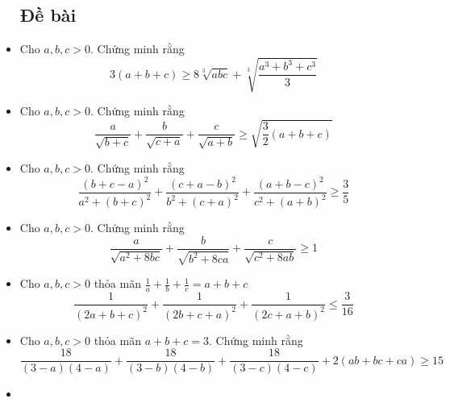 \documentclass[11pt]{scrartcl}
\begin{document}
\begin{itemize}[label=, leftmargin=0em, itemsep=-0em]
    \subsection{\LARGE \textcolor{dk}{Đề bài}}
        \item \begin{btvn}
            Cho $a,b,c >0$. Chứng minh rằng
            \[
                3(a + b + c) \geq 8\sqrt[3]{abc} + \sqrt[3]{\frac{a^3 + b^3 + c^3}{3}}
            \]
        \end{btvn}
        \item \begin{btvn} Cho $a,b,c > 0$. Chứng minh rằng 
        \[
            \frac{a}{\sqrt{b + c}} + \frac{b}{\sqrt{c + a}} + \frac{c}{\sqrt{a + b}} \geq \sqrt{\frac{3}{2}(a + b + c)}
        \]
    \end{btvn}
        \item \begin{btvn}
            Cho $a,b,c >0$. Chứng minh rằng
            \[
                \frac{(b + c - a)^2}{a^2 + (b + c)^2} + \frac{(c + a - b)^2}{b^2 + (c + a)^2} + \frac{(a + b - c)^2}{c^2 + (a + b)^2} \geq \frac{3}{5}
            \]
        \end{btvn}
        \item \begin{btvn}
            Cho $a,b,c >0$. Chứng minh rằng
            \[
                \frac{a}{\sqrt{a^2 + 8bc}} + \frac{b}{\sqrt{b^2 + 8ca}} + \frac{c}{\sqrt{c^2 + 8ab}} \geq 1
            \]
        \end{btvn}
        \item \begin{btvn}
            Cho $a,b,c >0$ thỏa mãn $\frac{1}{a} + \frac{1}{b} + \frac{1}{c} = a + b + c$
            \[
                \frac{1}{(2a + b + c)^2} + \frac{1}{(2b + c + a)^2} + \frac{1}{(2c + a + b)^2} \leq \frac{3}{16}
            \]
        \end{btvn}
        \item \begin{btvn}
            Cho $a,b,c >0$ thỏa mãn $a + b + c = 3$. Chứng minh rằng
            \[
                \frac{18}{(3 -a )(4 - a)} + \frac{18}{(3 -b)(4 - b)} + \frac{18}{(3 -c )(4 - c)} + 2(ab + bc + ca) \geq 15
            \]
        \end{btvn}
        \item \begin{btvn}

\end{btvn}
\end{itemize}
\end{document}
